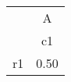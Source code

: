 \begin{tabular}{l*{1}{c}}
\hline\hline
            &           A\\
            &          c1\\
\hline
r1          &        0.50\\
\hline\hline
\end{tabular}
